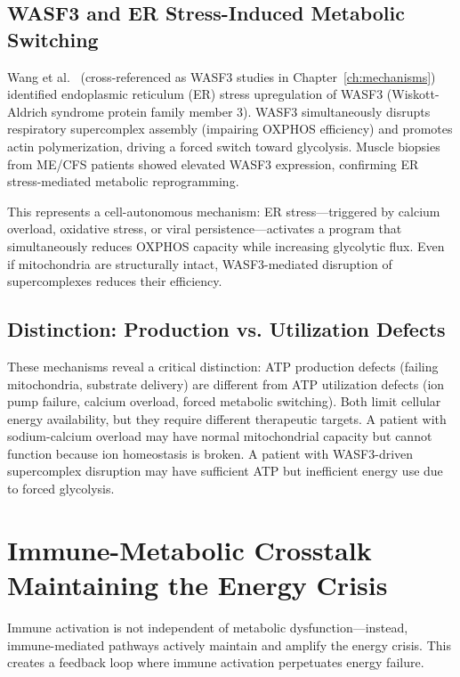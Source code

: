 \subsection{WASF3 and ER Stress-Induced Metabolic Switching}

Wang et al.~\cite{wang2023wasf3} (cross-referenced as WASF3 studies in Chapter~\ref{ch:mechanisms}) identified endoplasmic reticulum (ER) stress upregulation of WASF3 (Wiskott-Aldrich syndrome protein family member 3). WASF3 simultaneously disrupts respiratory supercomplex assembly (impairing OXPHOS efficiency) and promotes actin polymerization, driving a forced switch toward glycolysis. Muscle biopsies from ME/CFS patients showed elevated WASF3 expression, confirming ER stress-mediated metabolic reprogramming.

This represents a cell-autonomous mechanism: ER stress---triggered by calcium overload, oxidative stress, or viral persistence---activates a program that simultaneously reduces OXPHOS capacity while increasing glycolytic flux. Even if mitochondria are structurally intact, WASF3-mediated disruption of supercomplexes reduces their efficiency.

\subsection{Distinction: Production vs. Utilization Defects}

These mechanisms reveal a critical distinction: ATP production defects (failing mitochondria, substrate delivery) are different from ATP utilization defects (ion pump failure, calcium overload, forced metabolic switching). Both limit cellular energy availability, but they require different therapeutic targets. A patient with sodium-calcium overload may have normal mitochondrial capacity but cannot function because ion homeostasis is broken. A patient with WASF3-driven supercomplex disruption may have sufficient ATP but inefficient energy use due to forced glycolysis.

\section{Immune-Metabolic Crosstalk Maintaining the Energy Crisis}
\label{sec:immune-metabolic-crosstalk}

Immune activation is not independent of metabolic dysfunction---instead, immune-mediated pathways actively maintain and amplify the energy crisis. This creates a feedback loop where immune activation perpetuates energy failure.

